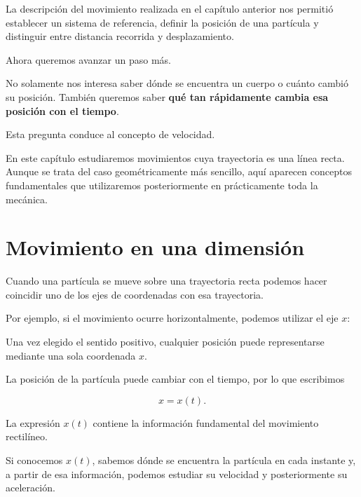 ﻿La descripción del movimiento realizada en el capítulo anterior nos permitió
establecer un sistema de referencia, definir la posición de una partícula y
distinguir entre distancia recorrida y desplazamiento.

Ahora queremos avanzar un paso más.

No solamente nos interesa saber dónde se encuentra un cuerpo o cuánto cambió
su posición. También queremos saber \textbf{qué tan rápidamente cambia esa
posición con el tiempo}.

Esta pregunta conduce al concepto de velocidad.

En este capítulo estudiaremos movimientos cuya trayectoria es una línea
recta. Aunque se trata del caso geométricamente más sencillo, aquí aparecen
conceptos fundamentales que utilizaremos posteriormente en prácticamente
toda la mecánica.


\section{Movimiento en una dimensión}

Cuando una partícula se mueve sobre una trayectoria recta podemos hacer
coincidir uno de los ejes de coordenadas con esa trayectoria.

Por ejemplo, si el movimiento ocurre horizontalmente, podemos utilizar el
eje \(x\):

\begin{center}
\end{center}

Una vez elegido el sentido positivo, cualquier posición puede representarse
mediante una sola coordenada \(x\).

La posición de la partícula puede cambiar con el tiempo, por lo que escribimos

\[ x=x(t). \]

\begin{interpretacion}
La expresión \(x(t)\) contiene la información fundamental del movimiento
rectilíneo.

Si conocemos \(x(t)\), sabemos dónde se encuentra la partícula en cada
instante y, a partir de esa información, podemos estudiar su velocidad y
posteriormente su aceleración.
\end{interpretacion}


